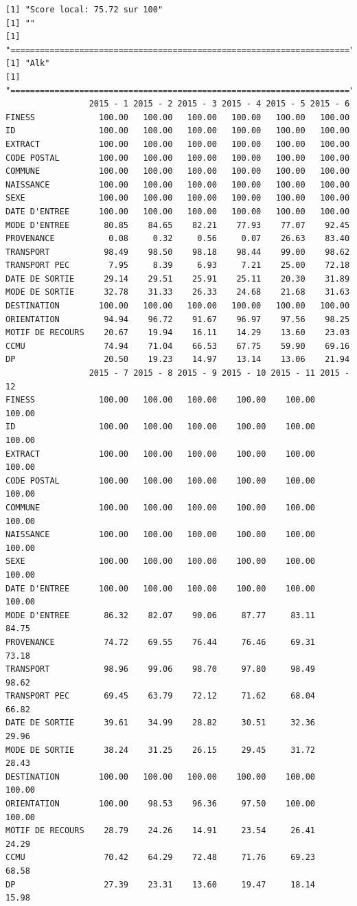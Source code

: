 \documentclass[]{article}
\begin{document}
\begin{verbatim}
[1] "Score local: 75.72 sur 100"
[1] ""
[1] "====================================================================="
[1] "Alk"
[1] "====================================================================="
                 2015 - 1 2015 - 2 2015 - 3 2015 - 4 2015 - 5 2015 - 6
FINESS             100.00   100.00   100.00   100.00   100.00   100.00
ID                 100.00   100.00   100.00   100.00   100.00   100.00
EXTRACT            100.00   100.00   100.00   100.00   100.00   100.00
CODE POSTAL        100.00   100.00   100.00   100.00   100.00   100.00
COMMUNE            100.00   100.00   100.00   100.00   100.00   100.00
NAISSANCE          100.00   100.00   100.00   100.00   100.00   100.00
SEXE               100.00   100.00   100.00   100.00   100.00   100.00
DATE D'ENTREE      100.00   100.00   100.00   100.00   100.00   100.00
MODE D'ENTREE       80.85    84.65    82.21    77.93    77.07    92.45
PROVENANCE           0.08     0.32     0.56     0.07    26.63    83.40
TRANSPORT           98.49    98.50    98.18    98.44    99.00    98.62
TRANSPORT PEC        7.95     8.39     6.93     7.21    25.00    72.18
DATE DE SORTIE      29.14    29.51    25.91    25.11    20.30    31.89
MODE DE SORTIE      32.78    31.33    26.33    24.68    21.68    31.63
DESTINATION        100.00   100.00   100.00   100.00   100.00   100.00
ORIENTATION         94.94    96.72    91.67    96.97    97.56    98.25
MOTIF DE RECOURS    20.67    19.94    16.11    14.29    13.60    23.03
CCMU                74.94    71.04    66.53    67.75    59.90    69.16
DP                  20.50    19.23    14.97    13.14    13.06    21.94
                 2015 - 7 2015 - 8 2015 - 9 2015 - 10 2015 - 11 2015 - 12
FINESS             100.00   100.00   100.00    100.00    100.00    100.00
ID                 100.00   100.00   100.00    100.00    100.00    100.00
EXTRACT            100.00   100.00   100.00    100.00    100.00    100.00
CODE POSTAL        100.00   100.00   100.00    100.00    100.00    100.00
COMMUNE            100.00   100.00   100.00    100.00    100.00    100.00
NAISSANCE          100.00   100.00   100.00    100.00    100.00    100.00
SEXE               100.00   100.00   100.00    100.00    100.00    100.00
DATE D'ENTREE      100.00   100.00   100.00    100.00    100.00    100.00
MODE D'ENTREE       86.32    82.07    90.06     87.77     83.11     84.75
PROVENANCE          74.72    69.55    76.44     76.46     69.31     73.18
TRANSPORT           98.96    99.06    98.70     97.80     98.49     98.62
TRANSPORT PEC       69.45    63.79    72.12     71.62     68.04     66.82
DATE DE SORTIE      39.61    34.99    28.82     30.51     32.36     29.96
MODE DE SORTIE      38.24    31.25    26.15     29.45     31.72     28.43
DESTINATION        100.00   100.00   100.00    100.00    100.00    100.00
ORIENTATION        100.00    98.53    96.36     97.50    100.00    100.00
MOTIF DE RECOURS    28.79    24.26    14.91     23.54     26.41     24.29
CCMU                70.42    64.29    72.48     71.76     69.23     68.58
DP                  27.39    23.31    13.60     19.47     18.14     15.98
\end{verbatim}
\end{document}
